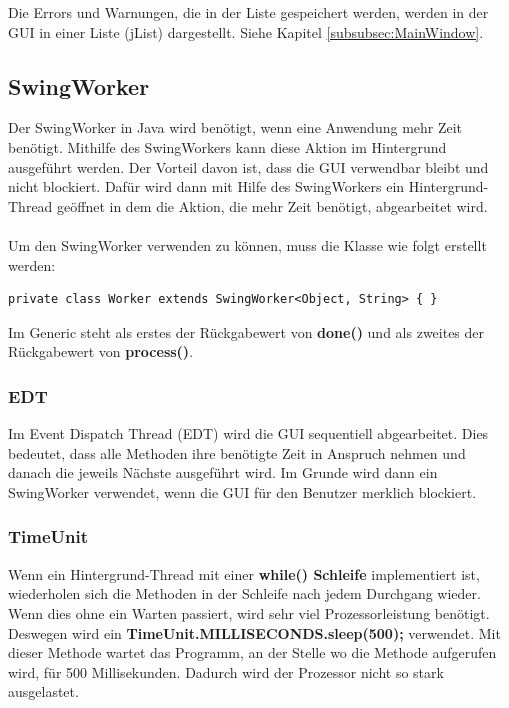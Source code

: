 Die Errors und Warnungen, die in der Liste gespeichert werden, werden in der GUI in einer Liste (jList) dargestellt. Siehe Kapitel \ref{subsubsec:MainWindow}. 

\subsection{SwingWorker}
Der SwingWorker in Java wird benötigt, wenn eine Anwendung mehr Zeit benötigt. Mithilfe des SwingWorkers kann diese Aktion im Hintergrund ausgeführt werden. Der Vorteil davon ist, dass die GUI verwendbar bleibt und nicht blockiert. Dafür wird dann mit Hilfe des SwingWorkers ein Hintergrund-Thread geöffnet in dem die Aktion, die mehr Zeit benötigt, abgearbeitet wird.
\\ \\ Um den SwingWorker verwenden zu können, muss die Klasse wie folgt erstellt werden:
\begin{lstlisting}[style=JavaStyle, caption=SwingWorker Klasse erstellen]
	private class Worker extends SwingWorker<Object, String> { } 
\end{lstlisting}
Im Generic steht als erstes der Rückgabewert von \textbf{done()} und als zweites der Rückgabewert von \textbf{process()}.

\subsubsection{EDT}
Im Event Dispatch Thread (EDT) wird die GUI sequentiell abgearbeitet. Dies bedeutet, dass alle Methoden ihre benötigte Zeit in Anspruch nehmen und danach die jeweils Nächste ausgeführt wird. Im Grunde wird dann ein SwingWorker verwendet, wenn die GUI für den Benutzer merklich blockiert. 

\subsubsection{TimeUnit}
Wenn ein Hintergrund-Thread mit einer \textbf{while() Schleife} implementiert ist, wiederholen sich die Methoden in der Schleife nach jedem Durchgang wieder. Wenn dies ohne ein Warten passiert, wird sehr viel Prozessorleistung benötigt. Deswegen wird ein \textbf{TimeUnit.MILLISECONDS.sleep(500);} verwendet. Mit dieser Methode wartet das Programm, an der Stelle wo die Methode aufgerufen wird, für 500 Millisekunden. Dadurch wird der Prozessor nicht so stark ausgelastet. 

